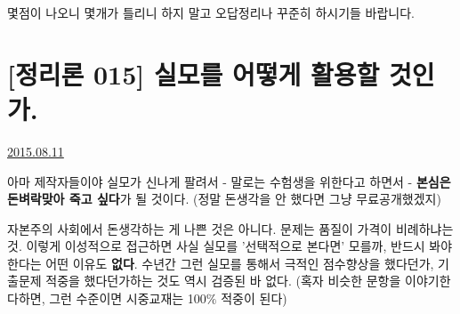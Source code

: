 몇점이 나오니 몇개가 틀리니 하지 말고 오답정리나 꾸준히 하시기들 바랍니다.
\vspace{5mm}






\section{[정리론 015] 실모를 어떻게 활용할 것인가.}
\href{https://www.kockoc.com/Apoc/242648}{2015.08.11}

\vspace{5mm}

아마 제작자들이야 실모가 신나게 팔려서 - 말로는 수험생을 위한다고 하면서 -
\textbf{본심은 돈벼락맞아 죽고 싶다}가 될 것이다.
(정말 돈생각을 안 했다면 그냥 무료공개했겠지)
\vspace{5mm}

자본주의 사회에서 돈생각하는 게 나쁜 것은 아니다. 문제는 품질이 가격이 비례하냐는 것.
이렇게 이성적으로 접근하면 사실 실모를 '선택적으로 본다면' 모를까, 반드시 봐야한다는 어떤 이유도 \textbf{없다}.
수년간 그런 실모를 통해서 극적인 점수향상을 했다던가, 기출문제 적중을 했다던가하는 것도 역시 검증된 바 없다.
(혹자 비슷한 문항을 이야기한다하면, 그런 수준이면 시중교재는 100$\%$ 적중이 된다)
\vspace{5mm}

